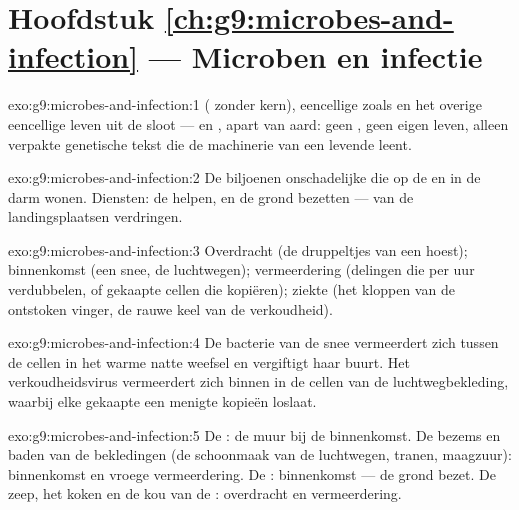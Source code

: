 \section*{Hoofdstuk \ref{ch:g9:microbes-and-infection} --- Microben en infectie}

\begin{solution}{exo:g9:microbes-and-infection:1}
 ( zonder kern), eencellige  zoals
 en het overige eencellige leven uit de sloot --- en ,
apart van aard: geen , geen eigen leven, alleen verpakte
genetische tekst die de machinerie van een levende  leent.
\end{solution}

\begin{solution}{exo:g9:microbes-and-infection:2}
De biljoenen onschadelijke  die op de  en in de darm
wonen. Diensten: de  helpen, en de grond bezetten ---
 van de landingsplaatsen verdringen.
\end{solution}

\begin{solution}{exo:g9:microbes-and-infection:3}
Overdracht (de druppeltjes van een hoest); binnenkomst (een snee,
de luchtwegen); vermeerdering (delingen die per uur verdubbelen, of
gekaapte cellen die kopiëren); ziekte (het kloppen van de ontstoken
vinger, de rauwe keel van de verkoudheid).
\end{solution}

\begin{solution}{exo:g9:microbes-and-infection:4}
De bacterie van de snee vermeerdert zich tussen de cellen in het
warme natte weefsel en vergiftigt haar buurt. Het
verkoudheidsvirus vermeerdert zich binnen in de cellen van de
luchtwegbekleding, waarbij elke gekaapte  een menigte kopieën
loslaat.
\end{solution}

\begin{solution}{exo:g9:microbes-and-infection:5}
De : de muur bij de binnenkomst. De bezems en baden van de
bekledingen (de schoonmaak van de luchtwegen, tranen, maagzuur):
binnenkomst en vroege vermeerdering. De :
binnenkomst --- de grond bezet. De zeep, het koken en de kou van de
: overdracht en vermeerdering.
\end{solution}

